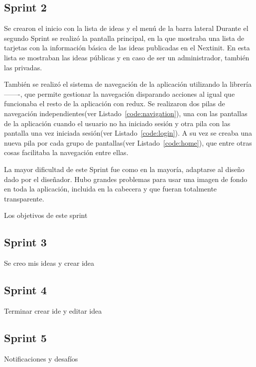 \subsection{Sprint 2}

Se crearon el inicio con la lista de ideas y el menú de la barra lateral
Durante el segundo Sprint se realizó la pantalla principal, en la que mostraba una lista de tarjetas con la 
información básica de las ideas publicadas en el Nextinit. En esta lista se mostraban las ideas públicas y 
en caso de ser un administrador, también las privadas.

También se realizó el sistema de navegación de la aplicación utilizando la librería -------, que permite gestionar 
la navegación disparando acciones al igual que funcionaba el resto de la aplicación con redux. Se realizaron dos 
pilas de navegación independientes(ver Listado~\ref{code:navigation}), una con las pantallas de la aplicación cuando el usuario no ha iniciado 
sesión y otra pila con las pantalla una vez iniciada sesión(ver Listado~\ref{code:login}). A su vez se creaba una nueva pila por cada grupo de pantallas(ver Listado~\ref{code:home}),
que entre otras cosas facilitaba la navegación entre ellas.





La mayor dificultad de este Sprint fue como en la mayoría, adaptarse al diseño dado por el diseñador. Hubo grandes problemas
para usar una imagen de fondo en toda la aplicación, incluida en la cabecera y que fueran totalmente transparente.

Los objetivos de este sprint

\subsection{Sprint 3}

Se creo mis ideas y crear idea

\subsection{Sprint 4}

Terminar crear ide y editar idea

\subsection{Sprint 5}

Notificaciones y desafíos

